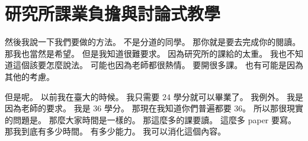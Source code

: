 \section{研究所課業負擔與討論式教學}

\hypertarget{w01:cue:509}{}然後我說一下我們要做的方法。
\hypertarget{w01:cue:510}{}不是分道的同學。
\hypertarget{w01:cue:511}{}那你就是要去完成你的閱讀。
\hypertarget{w01:cue:512}{}那我也當然是希望。
\hypertarget{w01:cue:513}{}但是我知道很難要求。
\hypertarget{w01:cue:514}{}因為研究所的課給的太重。
\hypertarget{w01:cue:515}{}我也不知道這個該要怎麼說法。
\hypertarget{w01:cue:516}{}可能也因為老師都很熱情。
\hypertarget{w01:cue:517}{}要開很多課。
\hypertarget{w01:cue:518}{}也有可能是因為其他的考慮。

\hypertarget{w01:cue:519}{}但是呢。
\hypertarget{w01:cue:520}{}以前我在臺大的時候。
\hypertarget{w01:cue:521}{}我只需要 24 學分就可以畢業了。
\hypertarget{w01:cue:522}{}我例外。
\hypertarget{w01:cue:523}{}我是因為老師的要求。
\hypertarget{w01:cue:524}{}我是 36 學分。
\hypertarget{w01:cue:525}{}那現在我知道你們普遍都要 36。
\hypertarget{w01:cue:526}{}所以那很現實的問題是。
\hypertarget{w01:cue:527}{}那麼大家時間是一樣的。
\hypertarget{w01:cue:528}{}那這麼多的課要讀。
\hypertarget{w01:cue:529}{}這麼多 paper 要寫。
\hypertarget{w01:cue:530}{}那我到底有多少時間。
\hypertarget{w01:cue:531}{}有多少能力。
\hypertarget{w01:cue:532}{}我可以消化這個內容。

